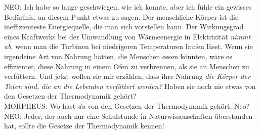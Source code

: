 \begin{playdialog}
NEO: Ich habe so lange geschwiegen, wie ich konnte, aber ich fühle ein gewisses Bedürfnis, an diesem Punkt etwas zu sagen. Der menschliche Körper ist die ineffizienteste Energiequelle, die man sich vorstellen kann. Der Wirkungsgrad eines Kraftwerks bei der Umwandlung von Wärmeenergie in Elektrizität \emph{nimmt ab}, wenn man die Turbinen bei niedrigeren Temperaturen laufen lässt. Wenn sie irgendeine Art von Nahrung hätten, die Menschen essen könnten, wäre es effizienter, diese Nahrung in einem Ofen zu verbrennen, als sie an Menschen zu verfüttern. Und jetzt wollen sie mir erzählen, dass ihre Nahrung \emph{die Körper der Toten} \emph{sind, die an die Lebenden verfüttert werden?} Haben sie noch nie etwas von den Gesetzen der Thermodynamik gehört?\\

MORPHEUS: Wo hast \emph{du} von den Gesetzen der Thermodynamik gehört, Neo?\\

NEO: Jeder, der auch nur eine Schulstunde in Naturwissenschaften überstanden hat, sollte die Gesetze der Thermodynamik kennen!\\


\end{playdialog}
